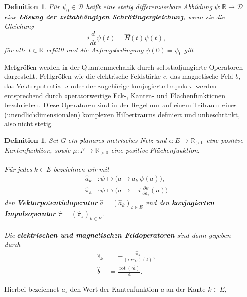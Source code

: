 \documentclass[11pt,a4paper,leqno]{report}
\newtheorem{definition}[theorem]{Definition}
\numberwithin{equation}{chapter}
\begin{document}
\begin{definition} \label{def:schroedinger}
	Für \(\psi_0 \in \mathcal{D}\) heißt eine stetig differenzierbare Abbildung 
	\(\psi: \mathbb{R} \to \mathcal{D}\) eine \textbf{Lösung der zeitabhängigen 
		Schrödingergleichung}, wenn sie die Gleichung
	\begin{equation} \label{eq:maxwell_schrödinger}
		i \frac{d}{dt}\psi(t) = \hat{H}(t)\psi(t),
	\end{equation}
	für alle \(t \in \mathbb{R}\) erfüllt und die Anfangsbedingung \(\psi(0) = \psi_0\) gilt.
\end{definition}
\noindent
Meßgrößen werden in der Quantenmechanik durch selbstadjungierte Operatoren dargestellt. 
Feldgrößen wie die elektrische Feldstärke \(e\), das magnetische Feld \(b\), 
das Vektorpotential \(a\) oder der zugehörige konjugierte Impuls \(\pi\) 
werden entsprechend durch operatorwertige Eck-, Kanten- und Flächenfunktionen beschrieben.  
Diese Operatoren sind in der Regel nur auf einem Teilraum eines (unendlichdimensionalen) komplexen Hilbertraums definiert und unbeschränkt, 
also nicht stetig.
\begin{definition} \label{def:feldoperatoren}
	Sei \(G\) ein planares metrisches Netz und \(\epsilon: E \to \mathbb{R}_{>0}\) eine positive Kantenfunktion, 
	sowie \(\mu: F \to \mathbb{R}_{>0}\) eine positive Flächenfunktion.  
	\\
	\\
	Für jedes \(k \in E\) bezeichnen wir mit
	\begin{align}
		\hat{a}_k &: \psi \longmapsto 
		\big(a \mapsto a_k\,\psi(a)\big), \label{eq:ak} \\[4pt]
		\hat{\pi}_k &: \psi \longmapsto 
		\big(a \mapsto -\,i\,\frac{\partial\psi}{\partial a_k}(a)\big) \label{eq:pi}
	\end{align}
	den \textbf{Vektorpotentialoperator} \(\hat{a} = (\hat{a}_k)_{k\in E}\) und den 
	\textbf{konjugierten Impulsoperator} \(\hat{\pi} = (\hat{\pi}_k)_{k\in E}\).  
	\\
	\\
	Die \textbf{elektrischen und magnetischen Feldoperatoren} sind dann gegeben durch
	\begin{align}
		\hat{e}_k &= -\frac{\hat{\pi}_k}{(\epsilon\,rr_D)(k)}, \label{eq:ek} \\[4pt]
		\hat{b} &= \frac{\operatorname{rot}(r \hat{a})}{\mathbb{A}}. \label{eq:b}
	\end{align}
\end{definition}
\noindent
Hierbei bezeichnet \(a_k\) den Wert der Kantenfunktion \(a\) an der Kante \(k \in E\), 
\end{document}

